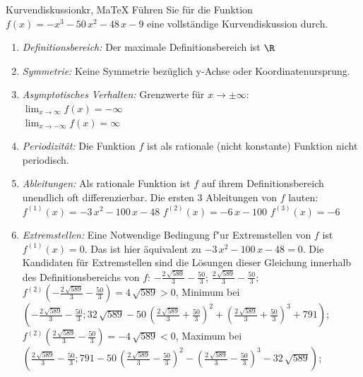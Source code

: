  \providecommand{\MoIl}{(} 
 \providecommand{\MoIr}{)}
 \providecommand{\MIntvlSep}{;} 
 \providecommand{\MElSetSep}{;} 
 \begin{MAufgabe}{Kurvendiskussion}{kr, MaTeX}
 F\"uhren Sie f\"ur die Funktion $f(x)= - x^3 - 50\, x^2 - 48\, x - 9$ eine vollst\"andige Kurvendiskussion durch.\\ 
 \ifLsg\Loesung
 \begin{enumerate}
 \item \emph{Definitionsbereich:} 
 Der maximale Definitionsbereich ist $\R$\item \emph{Symmetrie:} 
 Keine Symmetrie bez\"uglich y-Achse oder Koordinatenursprung.\item \emph{Asymptotisches Verhalten:} 
 Grenzwerte f\"ur $x\rightarrow \pm \infty$: \\ 
 $\lim_{x\rightarrow \infty} f(x)=- \infty$ \\ 
 $\lim_{x\rightarrow -\infty} f(x)=\infty$ \\ 
 \item \emph{Periodizit\"at:} 
 Die Funktion $f$ ist als rationale (nicht konstante) Funktion nicht periodisch.\item \emph{Ableitungen:} 
 Als rationale Funktion ist $f$ auf ihrem Definitionsbereich unendlich oft differenzierbar. 
 Die ersten 3 Ableitungen von $f$ lauten: \\ 
 $f^{(1)}(x)= - 3\, x^2 - 100\, x - 48$\newline 
  $f^{(2)}(x)= - 6\, x - 100$\newline 
  $f^{(3)}(x)=-6$\newline 
  \item \emph{Extremstellen:} 
 Eine Notwendige Bedingung f"ur Extremstellen von $f$ ist $f^{(1)}(x)=0$. 
 Das ist hier \"aquivalent zu $ - 3\, x^2 - 100\, x - 48=0$. 
 Die Kandidaten f\"ur Extremstellen sind die L\"osungen dieser Gleichung innerhalb des Definitionsbereichs von $f$: $ - \frac{2\, \sqrt{589}}{3} - \frac{50}{3}$; $\frac{2\, \sqrt{589}}{3} - \frac{50}{3}$; \\ 
 $f^{(2)}( - \frac{2\, \sqrt{589}}{3} - \frac{50}{3})=4\, \sqrt{589}$$>0$, Minimum bei $( - \frac{2\, \sqrt{589}}{3} - \frac{50}{3};32\, \sqrt{589} - 50\, {\left(\frac{2\, \sqrt{589}}{3} + \frac{50}{3}\right)}^2 + {\left(\frac{2\, \sqrt{589}}{3} + \frac{50}{3}\right)}^3 + 791)$; \\ 
 $f^{(2)}(\frac{2\, \sqrt{589}}{3} - \frac{50}{3})=- 4\, \sqrt{589}$$<0$, Maximum bei $(\frac{2\, \sqrt{589}}{3} - \frac{50}{3};791 - 50\, {\left(\frac{2\, \sqrt{589}}{3} - \frac{50}{3}\right)}^2 - {\left(\frac{2\, \sqrt{589}}{3} - \frac{50}{3}\right)}^3 - 32\, \sqrt{589})$; \\ 

\end{enumerate}
\end{MAufgabe}
